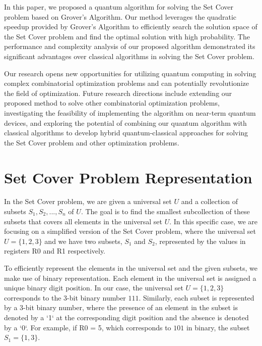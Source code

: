 In this paper, we proposed a quantum algorithm for solving the Set Cover problem based on Grover's Algorithm. Our method leverages the quadratic speedup provided by Grover's Algorithm to efficiently search the solution space of the Set Cover problem and find the optimal solution with high probability. The performance and complexity analysis of our proposed algorithm demonstrated its significant advantages over classical algorithms in solving the Set Cover problem.

Our research opens new opportunities for utilizing quantum computing in solving complex combinatorial optimization problems and can potentially revolutionize the field of optimization. Future research directions include extending our proposed method to solve other combinatorial optimization problems, investigating the feasibility of implementing the algorithm on near-term quantum devices, and exploring the potential of combining our quantum algorithm with classical algorithms to develop hybrid quantum-classical approaches for solving the Set Cover problem and other optimization problems.

% 
% 

\section{Set Cover Problem Representation}

In the Set Cover problem, we are given a universal set $U$ and a collection of subsets $S_1, S_2, ..., S_n$ of $U$. The goal is to find the smallest subcollection of these subsets that covers all elements in the universal set $U$. In this specific case, we are focusing on a simplified version of the Set Cover problem, where the universal set $U = \{1, 2, 3\}$ and we have two subsets, $S_1$ and $S_2$, represented by the values in registers R0 and R1 respectively. 

To efficiently represent the elements in the universal set and the given subsets, we make use of binary representation. Each element in the universal set is assigned a unique binary digit position. In our case, the universal set $U = \{1, 2, 3\}$ corresponds to the 3-bit binary number $111$. Similarly, each subset is represented by a 3-bit binary number, where the presence of an element in the subset is denoted by a `1` at the corresponding digit position and the absence is denoted by a `0`. For example, if R0 = 5, which corresponds to $101$ in binary, the subset $S_1 = \{1, 3\}$.

